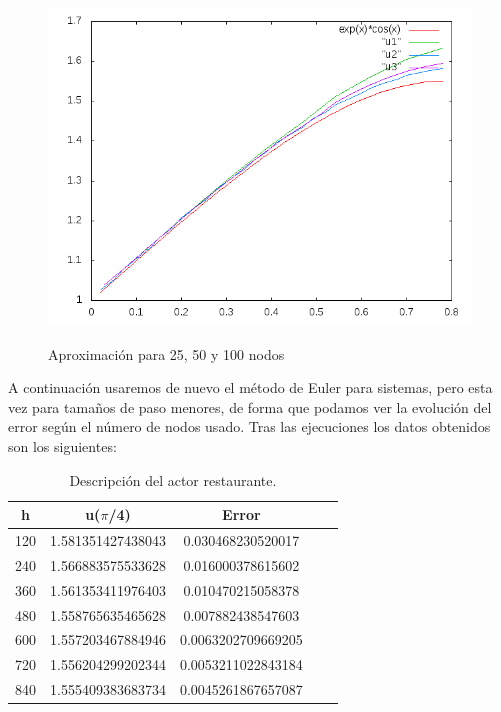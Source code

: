 \documentclass[12pt]{article}       %
\begin{document}
\begin{figure}[H]
\centering
\includegraphics[scale=0.65]{img/graphic.png}
\label{figura1}
\caption{Aproximación para 25, 50 y 100 nodos} 
\end{figure}

A continuación usaremos de nuevo el método de Euler para sistemas, pero esta vez para tamaños de paso menores, de forma que podamos ver la evolución del error según el número de nodos usado. Tras las ejecuciones los datos obtenidos son los siguientes:

    \begin{table}[H]
        \centering
        \setlength\extrarowheight{3pt}
        
        \begin{tabular}{|c|c|c|c|c}
            \hline
            \textbf{h} & {\textbf{u($\pi$/4)}} & \textbf{Error} \\ 
            \hline
                120 & 1.581351427438043 & 0.030468230520017\\
            \hline
                240 & 1.566883575533628 & 0.016000378615602\\
            \hline
                360 & 1.561353411976403 & 0.010470215058378\\
            \hline
                480 & 1.558765635465628 & 0.007882438547603\\
            \hline
                600 & 1.557203467884946 & 0.0063202709669205\\
            \hline
                720 &  1.556204299202344 & 0.0053211022843184\\
            \hline
                840 & 1.555409383683734 & 0.0045261867657087\\
            \hline
        \end{tabular}
        
        \caption{Descripción del actor restaurante.}
        \label{table:actor:restaurante}             
    \end{table}
\end{document}

